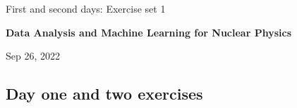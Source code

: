 \documentclass[%
oneside,                 %
final,                   %
10pt]{article}
\begin{document}

\newcommand{\exercisesection}[1]{\subsection*{#1}}






\thispagestyle{empty}

\begin{center}
{\LARGE\bf
\begin{spacing}{1.25}
First and second days: Exercise set 1
\end{spacing}
}
\end{center}


\begin{center}
{\bf Data Analysis and Machine Learning for Nuclear Physics${}^{}$} \\ [0mm]
\end{center}

\begin{center}
\end{center}
    

\begin{center}
Sep 26, 2022
\end{center}

\vspace{1cm}


\subsection*{Day one and two  exercises}
\end{document}
